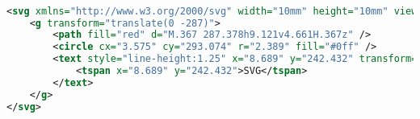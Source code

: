 \begin{lstlisting}[caption=Exemplo de um SVG comprimido,label={xml4},language=XML]

<svg xmlns="http://www.w3.org/2000/svg" width="10mm" height="10mm" viewBox="0 0 10 10">
    <g transform="translate(0 -287)">
        <path fill="red" d="M.367 287.378h9.121v4.661H.367z" />
        <circle cx="3.575" cy="293.074" r="2.389" fill="#0ff" />
        <text style="line-height:1.25" x="8.689" y="242.432" transform="scale(.82155 1.2172)" font-weight="400" font-size="1.273" font-family="sans-serif" letter-spacing="0" word-spacing="0" stroke-width=".032">
            <tspan x="8.689" y="242.432">SVG</tspan>
        </text>
    </g>
</svg>


\end{lstlisting}